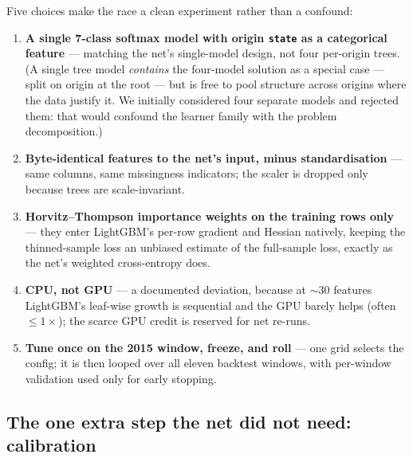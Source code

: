 \documentclass[11pt]{article}
\begin{document}
\begin{keyidea}
Five choices make the race a clean experiment rather than a confound:
\begin{enumerate}[leftmargin=1.4em, itemsep=2pt]
  \item \textbf{A single 7-class softmax model with origin \texttt{state} as a categorical
        feature} --- matching the net's single-model design, not four per-origin trees. (A single
        tree model \emph{contains} the four-model solution as a special case --- split on origin
        at the root --- but is free to pool structure across origins where the data justify it.
        We initially considered four separate models and rejected them: that would confound the
        learner family with the problem decomposition.)
  \item \textbf{Byte-identical features to the net's input, minus standardisation} --- same
        columns, same missingness indicators; the scaler is dropped only because trees are
        scale-invariant.
  \item \textbf{Horvitz--Thompson importance weights on the training rows only} --- they enter
        LightGBM's per-row gradient and Hessian natively, keeping the thinned-sample loss an
        unbiased estimate of the full-sample loss, exactly as the net's weighted cross-entropy
        does.
  \item \textbf{CPU, not GPU} --- a documented deviation, because at $\sim$30 features LightGBM's
        leaf-wise growth is sequential and the GPU barely helps (often $\le 1\times$); the scarce
        GPU credit is reserved for net re-runs.
  \item \textbf{Tune once on the 2015 window, freeze, and roll} --- one grid selects the config;
        it is then looped over all eleven backtest windows, with per-window validation used only
        for early stopping.
\end{enumerate}
\end{keyidea}

\subsection{The one extra step the net did not need: calibration}
\end{document}
